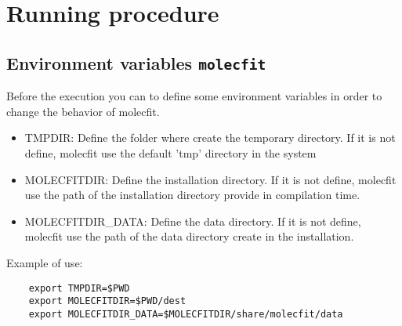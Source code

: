 \section{Running procedure}\label{sec:running}
\subsection{Environment variables {\tt molecfit}}\label{sec:variables}
Before the execution you can to define some environment variables in order to 
change the behavior of molecfit.
\begin{itemize}
  \item TMPDIR: Define the folder where create the temporary directory.
        If it is not define, molecfit use the default 'tmp' directory in the system
  \item MOLECFITDIR: Define the installation directory.
        If it is not define, molecfit use the path of the installation directory provide in compilation time.
  \item MOLECFITDIR\_DATA: Define the data directory.
        If it is not define, molecfit use the path of the data directory create in the installation.
\end{itemize}
Example of use:
\begin{verbatim}
    export TMPDIR=$PWD
    export MOLECFITDIR=$PWD/dest
    export MOLECFITDIR_DATA=$MOLECFITDIR/share/molecfit/data
\end{verbatim}

